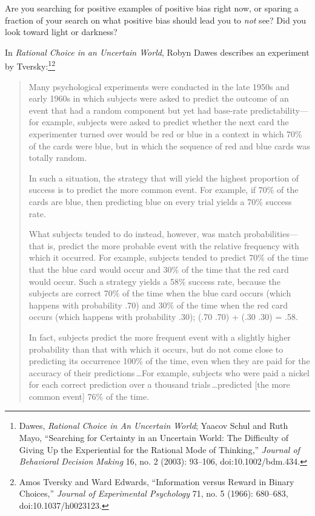 {
 Are you searching for positive examples of positive bias right
now, or sparing a fraction of your search on what positive bias should
lead you to \textit{not} see? Did you look toward light or darkness?}

\myendsectiontext


\bigskip


{
 In \textit{Rational Choice in an Uncertain World}, Robyn Dawes
describes an experiment by Tversky:\footnote{Dawes, \textit{Rational Choice in An Uncertain World}; Yaacov
Schul and Ruth Mayo, ``Searching for Certainty in an
Uncertain World: The Difficulty of Giving Up the Experiential for the
Rational Mode of Thinking,'' \textit{Journal of
Behavioral Decision Making} 16, no. 2 (2003): 93--106,
doi:10.1002/bdm.434.}\supercomma\footnote{Amos Tversky and Ward Edwards, ``Information
versus Reward in Binary Choices,'' \textit{Journal of
Experimental Psychology} 71, no. 5 (1966): 680--683,
doi:10.1037/h0023123.}}

\begin{quotation}
{
 Many psychological experiments were conducted in the late 1950s
and early 1960s in which subjects were asked to predict the outcome of
an event that had a random component but yet had base-rate
predictability---for example, subjects were asked to predict whether
the next card the experimenter turned over would be red or blue in a
context in which 70\% of the cards were blue, but in which the sequence
of red and blue cards was totally random.}

{
 In such a situation, the strategy that will yield the highest
proportion of success is to predict the more common event. For example,
if 70\% of the cards are blue, then predicting blue on every trial
yields a 70\% success rate.}

{
 What subjects tended to do instead, however, was match
probabilities---that is, predict the more probable event with the
relative frequency with which it occurred. For example, subjects tended
to predict 70\% of the time that the blue card would occur and 30\% of
the time that the red card would occur. Such a strategy yields a 58\%
success rate, because the subjects are correct 70\% of the time when
the blue card occurs (which happens with probability .70) and 30\% of
the time when the red card occurs (which happens with probability .30);
(.70 {\texttimes} .70) + (.30 {\texttimes} .30) = .58.}

{
 In fact, subjects predict the more frequent event with a slightly
higher probability than that with which it occurs, but do not come
close to predicting its occurrence 100\% of the time, even when they
are paid for the accuracy of their predictions\,\ldots For example,
subjects who were paid a nickel for each correct prediction over a
thousand trials\,\ldots predicted [the more common event] 76\% of the
time.}
\end{quotation}

